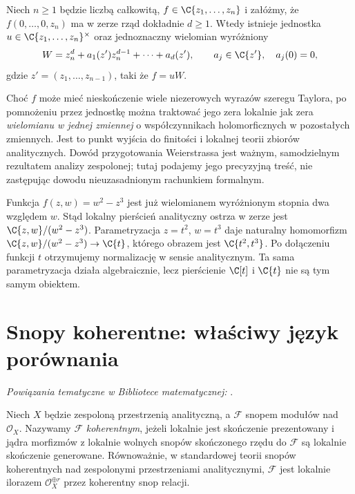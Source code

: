 \begin{twierdzenie}
\label{tw:ga9-weierstrass}
Niech $n\ge1$ będzie liczbą całkowitą,
$f\in\C\{z_1,\ldots,z_n\}$ i załóżmy, że
$f(0,\ldots,0,z_n)$ ma w zerze rząd dokładnie $d\ge1$.
Wtedy istnieje jednostka $u\in\C\{z_1,\ldots,z_n\}^\times$
oraz jednoznaczny wielomian wyróżniony
\[
 W=z_n^d+a_1(z')z_n^{d-1}+\cdots+a_d(z'),
 \qquad a_j\in\C\{z'\},\quad a_j(0)=0,
\]
gdzie $z'=(z_1,\ldots,z_{n-1})$, taki że $f=uW$.
\end{twierdzenie}

\begin{uwaga}
Choć $f$ może mieć nieskończenie wiele niezerowych wyrazów
szeregu Taylora, po pomnożeniu przez jednostkę można traktować
jego zera lokalnie jak zera \emph{wielomianu w jednej zmiennej}
o współczynnikach holomorficznych w pozostałych zmiennych.
Jest to punkt wyjścia do finitości i lokalnej teorii zbiorów
analitycznych. Dowód przygotowania Weierstrassa jest ważnym,
samodzielnym rezultatem analizy zespolonej; tutaj podajemy jego
precyzyjną treść, nie zastępując dowodu nieuzasadnionym
rachunkiem formalnym.
\end{uwaga}

\begin{przyklad}
Funkcja $f(z,w)=w^2-z^3$ jest już wielomianem wyróżnionym
stopnia dwa względem $w$. Stąd lokalny pierścień analityczny
ostrza w zerze jest $\C\{z,w\}/(w^2-z^3)$.
Parametryzacja $z=t^2$, $w=t^3$ daje naturalny homomorfizm
$\C\{z,w\}/(w^2-z^3)\to\C\{t\}$, którego obrazem jest
$\C\{t^2,t^3\}$. Po dołączeniu funkcji $t$ otrzymujemy
normalizację w sensie analitycznym. Ta sama parametryzacja
działa algebraicznie, lecz pierścienie $\C[t]$ i $\C\{t\}$
nie są tym samym obiektem.
\end{przyklad}

\section{Snopy koherentne: właściwy język porównania}
\label{sec:ga9-koherentne}

\noindent\emph{Powiązania tematyczne w Bibliotece matematycznej:} .


\begin{definicja}
Niech $X$ będzie zespoloną przestrzenią analityczną,
a $\mathcal F$ snopem modułów nad $\mathcal O_X$.
Nazywamy $\mathcal F$ \emph{koherentnym}, jeżeli lokalnie
jest skończenie prezentowany i jądra morfizmów z lokalnie
wolnych snopów skończonego rzędu do $\mathcal F$ są lokalnie
skończenie generowane. Równoważnie, w standardowej teorii
snopów koherentnych nad zespolonymi przestrzeniami
analitycznymi, $\mathcal F$ jest lokalnie ilorazem
$\mathcal O_X^{\oplus r}$ przez koherentny snop relacji.
\end{definicja}

